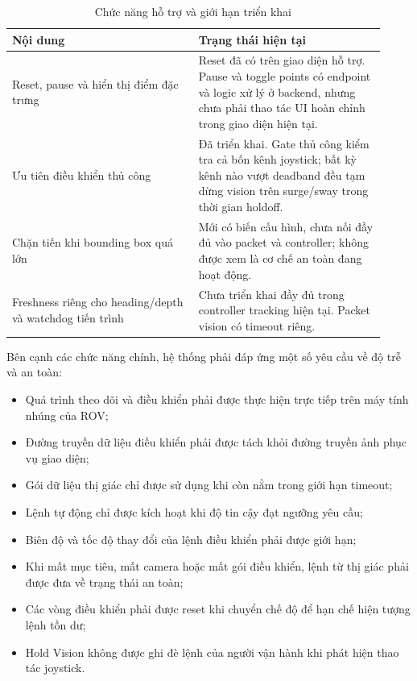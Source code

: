 \documentclass[../DoAn.tex]{subfiles}
\begin{document}
\begin{table}[htbp]
    \centering
    \caption{Chức năng hỗ trợ và giới hạn triển khai}
    \label{tab:hotro_gioihan}
    \renewcommand{\arraystretch}{1.25}
    \begin{tabular}{|p{0.46\linewidth}|p{0.46\linewidth}|}
        \hline
        \textbf{Nội dung} & \textbf{Trạng thái hiện tại} \\
        \hline
        Reset, pause và hiển thị điểm đặc trưng & Reset đã có trên giao diện hỗ trợ. Pause và toggle points có endpoint và logic xử lý ở backend, nhưng chưa phải thao tác UI hoàn chỉnh trong giao diện hiện tại. \\
        \hline
        Ưu tiên điều khiển thủ công & Đã triển khai. Gate thủ công kiểm tra cả bốn kênh joystick; bất kỳ kênh nào vượt deadband đều tạm dừng vision trên surge/sway trong thời gian holdoff. \\
        \hline
        Chặn tiến khi bounding box quá lớn & Mới có biến cấu hình, chưa nối đầy đủ vào packet và controller; không được xem là cơ chế an toàn đang hoạt động. \\
        \hline
        Freshness riêng cho heading/depth và watchdog tiến trình & Chưa triển khai đầy đủ trong controller tracking hiện tại. Packet vision có timeout riêng. \\
        \hline
    \end{tabular}
\end{table}

Bên cạnh các chức năng chính, hệ thống phải đáp ứng một số yêu cầu về độ trễ và an toàn:
\begin{itemize}
    \item Quá trình theo dõi và điều khiển phải được thực hiện trực tiếp trên máy tính nhúng của ROV;
    \item Đường truyền dữ liệu điều khiển phải được tách khỏi đường truyền ảnh phục vụ giao diện;
    \item Gói dữ liệu thị giác chỉ được sử dụng khi còn nằm trong giới hạn timeout;
    \item Lệnh tự động chỉ được kích hoạt khi độ tin cậy đạt ngưỡng yêu cầu;
    \item Biên độ và tốc độ thay đổi của lệnh điều khiển phải được giới hạn;
    \item Khi mất mục tiêu, mất camera hoặc mất gói điều khiển, lệnh từ thị giác phải được đưa về trạng thái an toàn;
    \item Các vòng điều khiển phải được reset khi chuyển chế độ để hạn chế hiện tượng lệnh tồn dư;
    \item Hold Vision không được ghi đè lệnh của người vận hành khi phát hiện thao tác joystick.
\end{itemize}
\end{document}
